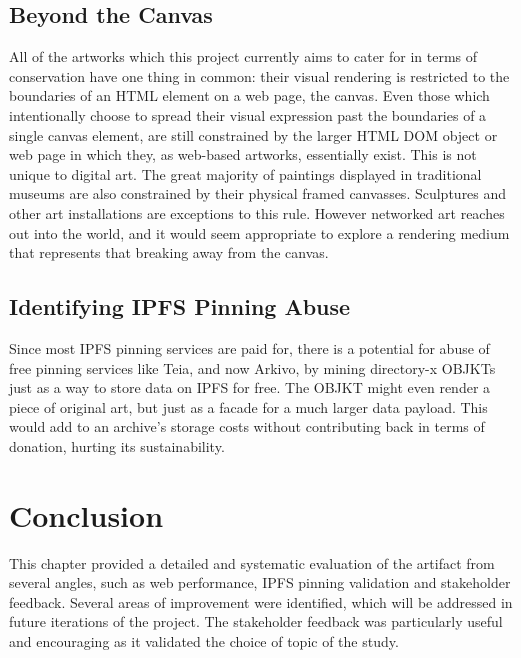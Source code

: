 \subsection{Beyond the Canvas}

All of the artworks which this project currently aims to cater for in terms of conservation have one thing in common: their visual rendering is restricted to the boundaries of an HTML element on a web page, the canvas. Even those which intentionally choose to spread their visual expression past the boundaries of a single canvas element, are still constrained by the larger HTML DOM object or web page in which they, as web-based artworks, essentially exist. This is not unique to digital art. The great majority of paintings displayed in traditional museums are also constrained by their physical framed canvasses. Sculptures and other art installations are exceptions to this rule. However networked art reaches out into the world, and it would seem appropriate to explore a rendering medium that represents that breaking away from the canvas.


\subsection{Identifying IPFS Pinning Abuse}

Since most IPFS pinning services are paid for, there is a potential for abuse of free pinning services like Teia, and now Arkivo, by mining directory-x OBJKTs just as a way to store data on IPFS for free. The OBJKT might even render a piece of original art, but just as a facade for a much larger data payload. This would add to an archive's storage costs without contributing back in terms of donation, hurting its sustainability.


\section{Conclusion}

This chapter provided a detailed and systematic evaluation of the artifact from several angles, such as web performance, IPFS pinning validation and stakeholder feedback.
Several areas of improvement were identified, which will be addressed in future iterations of the project. The stakeholder feedback was particularly useful and encouraging as it validated the choice of topic of the study.

